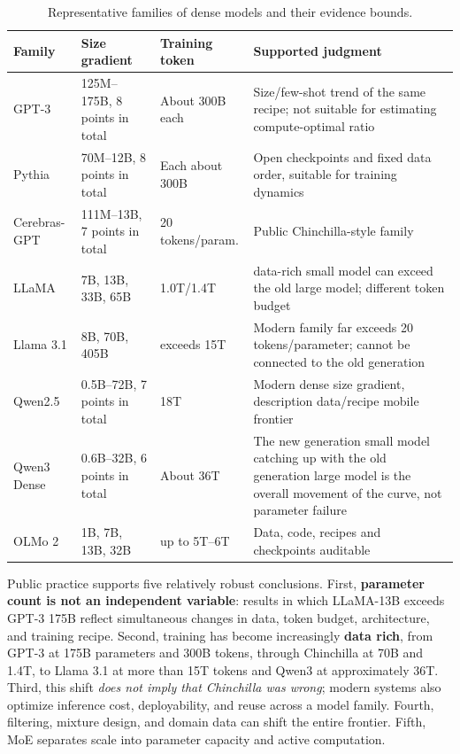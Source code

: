 \documentclass[UTF8,10pt,a4paper,fontset=none]{ctexart}
\begin{document}
\begin{table}[htbp]
\centering
\small
\caption{Representative families of dense models and their evidence bounds.}
\label{en:tab:dense-families}
\begin{tabularx}{\textwidth}{p{2.2cm}p{3.9cm}p{2.5cm}Y}
\toprule
Family & Size gradient & Training token & Supported judgment \\
\midrule
GPT-3 & 125M--175B, 8 points in total & About 300B each & Size/few-shot trend of the same recipe; not suitable for estimating compute-optimal ratio \cite{en:brown2020} \\
Pythia & 70M--12B, 8 points in total & Each about 300B & Open checkpoints and fixed data order, suitable for training dynamics \cite{en:biderman2023} \\
Cerebras-GPT & 111M--13B, 7 points in total & 20 tokens/param. & Public Chinchilla-style family\cite{en:cerebrasgpt2023} \\
LLaMA & 7B, 13B, 33B, 65B & 1.0T/1.4T & data-rich small model can exceed the old large model; different token budget \cite{en:llama2023} \\
Llama 3.1 & 8B, 70B, 405B & exceeds 15T & Modern family far exceeds 20 tokens/parameter; cannot be connected to the old generation \cite{en:llama31} \\
Qwen2.5 & 0.5B--72B, 7 points in total & 18T & Modern dense size gradient, description data/recipe mobile frontier\cite{en:qwen25} \\
Qwen3 Dense & 0.6B--32B, 6 points in total & About 36T & The new generation small model catching up with the old generation large model is the overall movement of the curve, not parameter failure \cite{en:qwen3} \\
OLMo 2 & 1B, 7B, 13B, 32B & up to 5T--6T & Data, code, recipes and checkpoints auditable \cite{en:olmo2} \\
\bottomrule
\end{tabularx}
\end{table}

Public practice supports five relatively robust conclusions. First, \textbf{parameter count is not an independent variable}: results in which LLaMA-13B exceeds GPT-3 175B reflect simultaneous changes in data, token budget, architecture, and training recipe. Second, training has become increasingly \textbf{data rich}, from GPT-3 at 175B parameters and 300B tokens, through Chinchilla at 70B and 1.4T, to Llama 3.1 at more than 15T tokens and Qwen3 at approximately 36T. Third, this shift \textit{does not imply that Chinchilla was wrong}; modern systems also optimize inference cost, deployability, and reuse across a model family. Fourth, filtering, mixture design, and domain data can shift the entire frontier. Fifth, MoE separates scale into parameter capacity and active computation.
\end{document}
